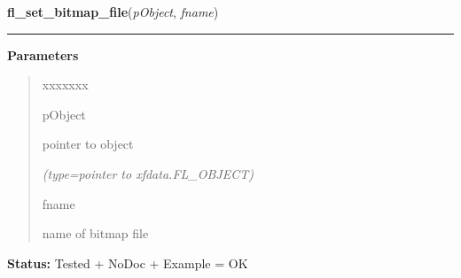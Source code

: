     \vspace{0.5ex}

\hspace{.8\funcindent}\begin{boxedminipage}{\funcwidth}

    \raggedright \textbf{fl\_set\_bitmap\_file}(\textit{pObject}, \textit{fname})

    \vspace{-1.5ex}

    \rule{\textwidth}{0.5\fboxrule}
\setlength{\parskip}{2ex}
\setlength{\parskip}{1ex}
      \textbf{Parameters}
      \vspace{-1ex}

      \begin{quote}
        \begin{Ventry}{xxxxxxx}

          \item[pObject]

          pointer to object

            {\it (type=pointer to xfdata.FL\_OBJECT)}

          \item[fname]

          name of bitmap file

        \end{Ventry}

      \end{quote}

\textbf{Status:} Tested + NoDoc + Example = OK



    \end{boxedminipage}

    \label{xformslib:library:fl_set_bitmap_file}

    \vspace{0.5ex}

